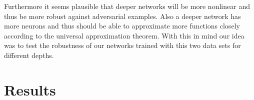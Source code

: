 \documentclass[%
 reprint,
 amsmath,amssymb,
 aps,
]{revtex4-1}
\begin{document}
Furthermore it seems plausible that deeper networks will be more nonlinear and thus be more robust against adversarial examples. Also a deeper network has more neurons and thus should be able to approximate more functions closely according to the universal approximation theorem. With this in mind our idea was to test the robustness of our networks trained with this two data sets for different depths.



\section{Results}
\end{document}
